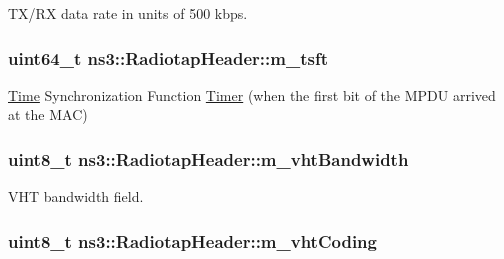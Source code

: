 T\+X/\+RX data rate in units of 500 kbps. 

\subsubsection[{\texorpdfstring{m\+\_\+tsft}{m_tsft}}]{\setlength{\rightskip}{0pt plus 5cm}uint64\+\_\+t ns3\+::\+Radiotap\+Header\+::m\+\_\+tsft\hspace{0.3cm}{\ttfamily [private]}}\hypertarget{classns3_1_1RadiotapHeader_afbf83bcbbcfeb4c41f1837ef32e301fa}{}\label{classns3_1_1RadiotapHeader_afbf83bcbbcfeb4c41f1837ef32e301fa}


\hyperlink{classns3_1_1Time}{Time} Synchronization Function \hyperlink{classns3_1_1Timer}{Timer} (when the first bit of the M\+P\+DU arrived at the M\+AC) 

\subsubsection[{\texorpdfstring{m\+\_\+vht\+Bandwidth}{m_vhtBandwidth}}]{\setlength{\rightskip}{0pt plus 5cm}uint8\+\_\+t ns3\+::\+Radiotap\+Header\+::m\+\_\+vht\+Bandwidth\hspace{0.3cm}{\ttfamily [private]}}\hypertarget{classns3_1_1RadiotapHeader_a5a21360554e80b96114f79c2e315fffe}{}\label{classns3_1_1RadiotapHeader_a5a21360554e80b96114f79c2e315fffe}


V\+HT bandwidth field. 

\subsubsection[{\texorpdfstring{m\+\_\+vht\+Coding}{m_vhtCoding}}]{\setlength{\rightskip}{0pt plus 5cm}uint8\+\_\+t ns3\+::\+Radiotap\+Header\+::m\+\_\+vht\+Coding\hspace{0.3cm}{\ttfamily [private]}}\hypertarget{classns3_1_1RadiotapHeader_a6d4b9a2225cf4343df89a95097baa603}{}\label{classns3_1_1RadiotapHeader_a6d4b9a2225cf4343df89a95097baa603}


